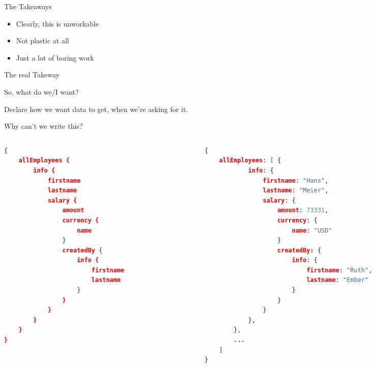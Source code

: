 \documentclass[aspectratio=169]{beamer}
\begin{document}
	\begin{frame}[fragile]{The Takeaways}
		\Large
		\begin{itemize}
			\item Clearly, this is unworkable
			\item Not plastic at all
			\item Just a lot of boring work
		\end{itemize}
	\end{frame}

	\begin{frame}{The real Takeway}
		\begin{center}
		\end{center}
	\end{frame}

	\begin{frame}{So, what do we/I want?}
		\begin{center}
			\Large
			Declare how we want data to get, when we're asking for it.
		\end{center}
	\end{frame}

	\begin{frame}[fragile]{Why can't we write this?}
		\vspace{-7mm}	
		\begin{columns}[t]
			\begin{column}{0.5\textwidth}
				\begin{lstlisting}[language=json,basicstyle=\scriptsize\ttfamily]
{
	allEmployees {
		info {
			firstname
			lastname
			salary {
				amount
				currency {
					name
				}
				createdBy {
					info {
						firstname
						lastname
					}
				}
			}
		}
	}
}
\end{lstlisting}	
			\end{column}\pause
			\begin{column}{0.5\textwidth}
				\begin{lstlisting}[language=json,basicstyle=\scriptsize\ttfamily]
{
	allEmployees: [ { 
			info: {
				firstname: "Hans",
				lastname: "Meier",
				salary: {
					amount: 73331,
					currency: {
						name: "USD"
					}
					createdBy: {
						info: {
							firstname: "Ruth",
							lastname: "Ember"
						}
					}
				}
			},
		},
		...
	]
}
\end{lstlisting}	
			\end{column}
			
		\end{columns}
	\end{frame}
\end{document}
